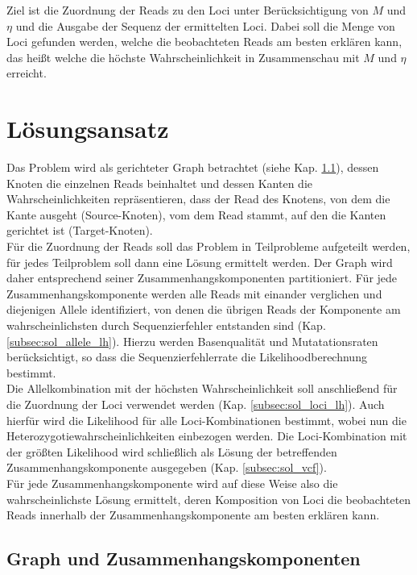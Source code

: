 Ziel ist die Zuordnung der Reads zu den Loci unter Berücksichtigung von $M$ und $\eta$ und die Ausgabe der Sequenz der ermittelten Loci. Dabei soll die Menge von Loci gefunden werden, welche die beobachteten Reads am besten erklären kann, das heißt welche die höchste Wahrscheinlichkeit in Zusammenschau mit $M$ und $\eta$ erreicht. \\

\section{Lösungsansatz} \label{sec:solution}

Das Problem wird als gerichteter Graph betrachtet (siehe Kap. \ref{subsec:sol_graph}), dessen Knoten die einzelnen Reads beinhaltet und dessen Kanten die Wahrscheinlichkeiten repräsentieren, dass der Read des Knotens, von dem die Kante ausgeht (Source-Knoten), vom dem Read stammt, auf den die Kanten gerichtet ist (Target-Knoten). \\

Für die Zuordnung der Reads soll das Problem in Teilprobleme aufgeteilt werden, für jedes Teilproblem soll dann eine Lösung ermittelt werden. Der Graph wird daher entsprechend seiner Zusammenhangskomponenten partitioniert. Für jede Zusammenhangskomponente werden alle Reads mit einander verglichen und diejenigen Allele identifiziert, von denen die übrigen Reads der Komponente am wahrscheinlichsten durch Sequenzierfehler entstanden sind (Kap. \ref{subsec:sol_allele_lh}). Hierzu werden Basenqualität und Mutatationsraten berücksichtigt, so dass die Sequenzierfehlerrate die Likelihoodberechnung bestimmt. \\

Die Allelkombination mit der höchsten Wahrscheinlichkeit soll anschließend für die Zuordnung der Loci verwendet werden (Kap. \ref{subsec:sol_loci_lh}). Auch hierfür wird die Likelihood für alle Loci-Kombinationen bestimmt, wobei nun die Heterozygotiewahrscheinlichkeiten einbezogen werden. Die Loci-Kombination mit der größten Likelihood wird schließlich als Lösung der betreffenden Zusammenhangskomponente ausgegeben (Kap. \ref{subsec:sol_vcf}).\\

Für jede Zusammenhangskomponente wird auf diese Weise also die wahrscheinlichste Lösung ermittelt, deren Komposition von Loci die beobachteten Reads innerhalb der Zusammenhangskomponente am besten erklären kann. \\


\subsection{Graph und Zusammenhangskomponenten} \label{subsec:sol_graph}

